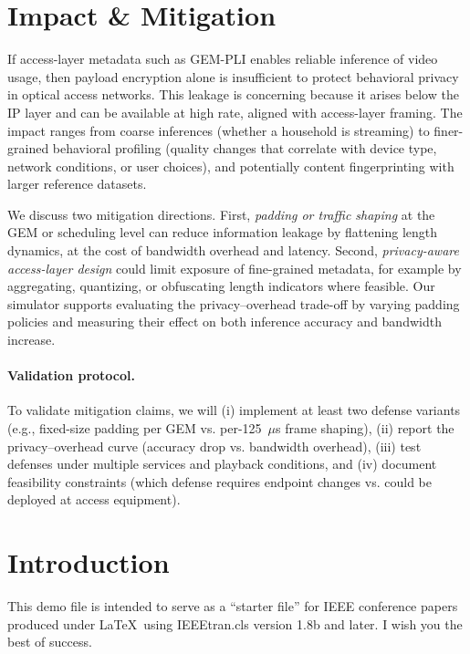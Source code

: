 \documentclass[conference]{IEEEtran}
\begin{document}
\section{Impact \& Mitigation}
If access-layer metadata such as GEM-PLI enables reliable inference of video usage, then payload encryption alone is insufficient to protect behavioral privacy in optical access networks. This leakage is concerning because it arises below the IP layer and can be available at high rate, aligned with access-layer framing. The impact ranges from coarse inferences (whether a household is streaming) to finer-grained behavioral profiling (quality changes that correlate with device type, network conditions, or user choices), and potentially content fingerprinting with larger reference datasets.

We discuss two mitigation directions. First, \emph{padding or traffic shaping} at the GEM or scheduling level can reduce information leakage by flattening length dynamics, at the cost of bandwidth overhead and latency. Second, \emph{privacy-aware access-layer design} could limit exposure of fine-grained metadata, for example by aggregating, quantizing, or obfuscating length indicators where feasible. Our simulator supports evaluating the privacy--overhead trade-off by varying padding policies and measuring their effect on both inference accuracy and bandwidth increase.

\paragraph{Validation protocol.} To validate mitigation claims, we will (i) implement at least two defense variants (e.g., fixed-size padding per GEM vs. per-125~$\mu$s frame shaping), (ii) report the privacy--overhead curve (accuracy drop vs. bandwidth overhead), (iii) test defenses under multiple services and playback conditions, and (iv) document feasibility constraints (which defense requires endpoint changes vs. could be deployed at access equipment).


\iffalse

\section{Introduction}
This demo file is intended to serve as a ``starter file''
for IEEE conference papers produced under \LaTeX\ using
IEEEtran.cls version 1.8b and later.
I wish you the best of success.
\end{document}
